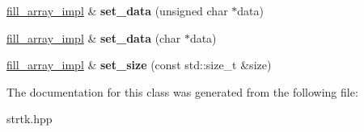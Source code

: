 \begin{DoxyCompactItemize}
\item 
\hypertarget{classstrtk_1_1details_1_1fill__array__impl_aa3618997b07b7f929f8a719f5865a316}{\hyperlink{classstrtk_1_1details_1_1fill__array__impl}{fill\-\_\-array\-\_\-impl} \& {\bfseries set\-\_\-data} (unsigned char $\ast$data)}\label{classstrtk_1_1details_1_1fill__array__impl_aa3618997b07b7f929f8a719f5865a316}

\item 
\hypertarget{classstrtk_1_1details_1_1fill__array__impl_a49b418a511431834cd920a6298f02d2e}{\hyperlink{classstrtk_1_1details_1_1fill__array__impl}{fill\-\_\-array\-\_\-impl} \& {\bfseries set\-\_\-data} (char $\ast$data)}\label{classstrtk_1_1details_1_1fill__array__impl_a49b418a511431834cd920a6298f02d2e}

\item 
\hypertarget{classstrtk_1_1details_1_1fill__array__impl_acb0db84ee556903d252157e6341b1577}{\hyperlink{classstrtk_1_1details_1_1fill__array__impl}{fill\-\_\-array\-\_\-impl} \& {\bfseries set\-\_\-size} (const std\-::size\-\_\-t \&size)}\label{classstrtk_1_1details_1_1fill__array__impl_acb0db84ee556903d252157e6341b1577}

\end{DoxyCompactItemize}


The documentation for this class was generated from the following file\-:\begin{DoxyCompactItemize}
\item 
strtk.\-hpp\end{DoxyCompactItemize}
